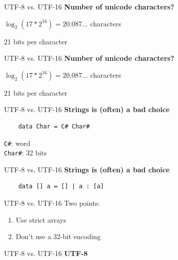 \documentclass[20pt]{beamer}
\newcommand{\vspaced}{
    \vspace{5mm}
}
\begin{document}
\begin{frame}{UTF-8 vs. UTF-16}
    \textbf{Number of unicode characters?} \\
    \vspaced
    $\log_2(17 * 2^{16}) = 20.087...$ characters \\
    \vspaced
    21 bits per character \\
\end{frame}

\begin{frame}{UTF-8 vs. UTF-16}
    \textbf{Number of unicode characters?} \\
    \vspaced
    $\log_2(17 * 2^{16}) = 20.087...$ characters \\
    \vspaced
    21 bits per character \\
\end{frame}

\begin{frame}[fragile]{UTF-8 vs. UTF-16}
    \textbf{Strings is (often) a bad choice} \\
    \vspaced
    \begin{lstlisting}
    data Char = C# Char#
    \end{lstlisting}
    \texttt{C\#}: word \\
    \texttt{Char\#}: 32 bits \\
\end{frame}

\begin{frame}[fragile]{UTF-8 vs. UTF-16}
    \textbf{Strings is (often) a bad choice} \\
    \vspaced
    \begin{lstlisting}
    data [] a = [] | a : [a]
    \end{lstlisting}
\end{frame}


\begin{frame}{UTF-8 vs. UTF-16}
    Two points: \\
    \begin{enumerate}
    \item Use strict arrays
    \item Don't use a 32-bit encoding
    \end{enumerate}
\end{frame}

\begin{frame}{UTF-8 vs. UTF-16}
    \textbf{UTF-8} \\
    \vspaced
\end{frame}
\end{document}
